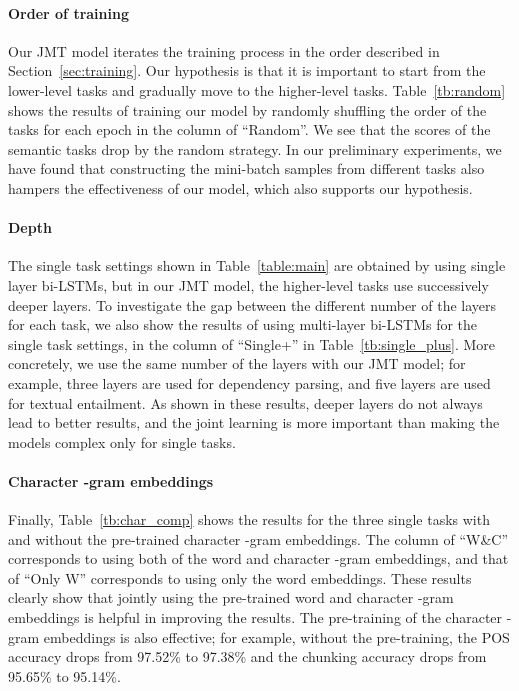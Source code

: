 \documentclass[11pt,a4paper]{article}
\begin{document}
\paragraph{Order of training}
Our JMT model iterates the training process in the order described in Section~\ref{sec:training}.
Our hypothesis is that it is important to start from the lower-level tasks and gradually move to the higher-level tasks.
Table~\ref{tb:random} shows the results of training our model by randomly shuffling the order of the tasks for each epoch in the column of ``Random''.
We see that the scores of the semantic tasks drop by the random strategy.
In our preliminary experiments, we have found that constructing the mini-batch samples from different tasks also hampers the effectiveness of our model, which also supports our hypothesis.

\paragraph{Depth}
The single task settings shown in Table~\ref{table:main} are obtained by using single layer bi-LSTMs, but in our JMT model, the higher-level tasks use successively deeper layers.
To investigate the gap between the different number of the layers for each task, we also show the results of using multi-layer bi-LSTMs for the single task settings, in the column of ``Single+'' in Table~\ref{tb:single_plus}.
More concretely, we use the same number of the layers with our JMT model; for example, three layers are used for dependency parsing, and five layers are used for textual entailment.
As shown in these results, deeper layers do not always lead to better results, and the joint learning is more important than making the models complex only for single tasks.

\paragraph{Character -gram embeddings}
Finally, Table~\ref{tb:char_comp} shows the results for the three single tasks with and without the pre-trained character -gram embeddings.
The column of ``W\&C'' corresponds to using both of the word and character -gram embeddings, and that of ``Only W'' corresponds to using only the word embeddings.
These results clearly show that jointly using the pre-trained word and character -gram embeddings is helpful in improving the results.
The pre-training of the character -gram embeddings is also effective;
for example, without the pre-training, the POS accuracy drops from 97.52\% to 97.38\% and the chunking accuracy drops from 95.65\% to 95.14\%.
\end{document}
